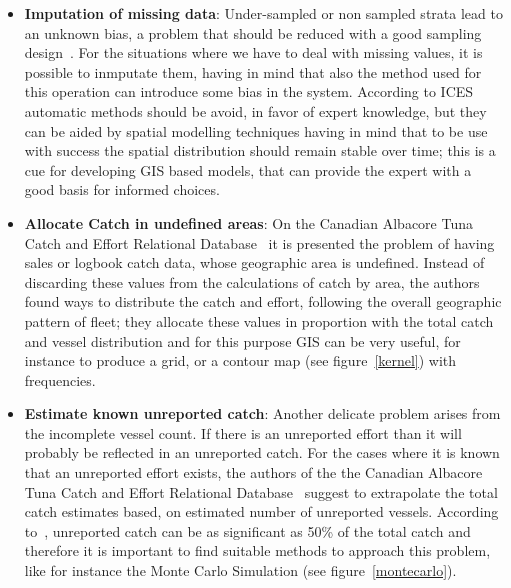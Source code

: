 \documentclass[11pt]{article} %
\begin{document}
\begin{itemize}
  \item \textbf{Imputation of missing data}: Under-sampled or non sampled strata lead to an unknown bias, a problem that should be reduced with a good sampling design~\cite{ices}. For the situations where we have to deal with missing values, it is possible to inmputate them, having in mind that also the method used for this operation can introduce some bias in the system. According to ICES~\cite{ices} automatic methods should be avoid, in favor of expert knowledge, but they can be aided by spatial modelling techniques having in mind that to be use with success the spatial distribution should remain stable over time; this is a cue for developing GIS based models, that can provide the expert with a good basis for informed choices.

  \item \textbf{Allocate Catch in undefined areas}: On the Canadian Albacore Tuna Catch and Effort Relational Database~\cite{tuna} it is presented the problem of having sales or logbook catch data, whose geographic area is undefined. Instead of discarding these values from the calculations of catch by area, the authors found ways to distribute the catch and effort, following the overall geographic pattern of fleet; they allocate these values in proportion with the total catch and vessel distribution and for this purpose GIS can be very useful, for instance to produce a grid, or a contour map (see figure~\ref{kernel}) with frequencies.

  \item \textbf{Estimate known unreported catch}: Another delicate problem arises from the incomplete vessel count. If there is an unreported effort than it will probably be reflected in an unreported catch. For the cases where it is known that an unreported effort exists, the authors of the the Canadian Albacore Tuna Catch and Effort Relational Database~\cite{tuna} suggest to extrapolate the total catch estimates based, on estimated number of unreported vessels. According to~\cite{morocco}, unreported catch can be as significant as 50\% of the total catch and therefore it is important to find suitable methods to approach this problem, like for instance the Monte Carlo Simulation (see figure~\ref{montecarlo}).

\end{itemize}
\end{document}
